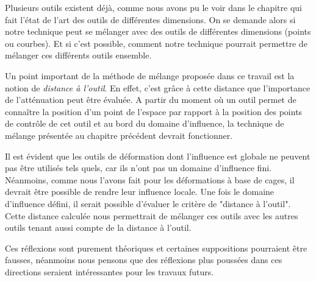Plusieurs outils existent déjà, comme nous avons pu le voir dans le chapitre
qui fait l'état de l'art des outils de différentes dimensions. On se demande
alors si notre technique peut se mélanger avec des outils de différentes
dimensions (points ou courbes). Et si c'est possible, comment notre technique
pourrait permettre de mélanger ces différents outils ensemble.

Un point important de la méthode de mélange proposée dans ce travail est la
notion de \textit{distance à l'outil}. En effet, c'est grâce à cette distance
que l'importance de l'atténuation peut être évaluée. A partir du moment où un
outil permet de connaître la position d'un point de l'espace par rapport à la
position des points de contrôle de cet outil et au bord du domaine
d'influence, la technique de mélange présentée au chapitre précédent devrait
fonctionner.

Il est évident que les outils de déformation dont l'influence est globale ne
peuvent pas être utilisés tels quels, car ils n'ont pas un domaine d'influence
fini. Néanmoins, comme nous l'avons fait pour les déformations à base de
cages, il devrait être possible de rendre leur influence locale. Une fois le
domaine d'influence défini, il serait possible d'évaluer le critère de
"distance à l'outil". Cette distance calculée nous permettrait de mélanger ces
outils avec les autres outils tenant aussi compte de la distance à l'outil.

Ces réflexions sont purement théoriques et certaines suppositions pourraient
être fausses, néanmoins nous pensons que des réflexions plus poussées dans ces
directions seraient intéressantes pour les travaux futurs.
